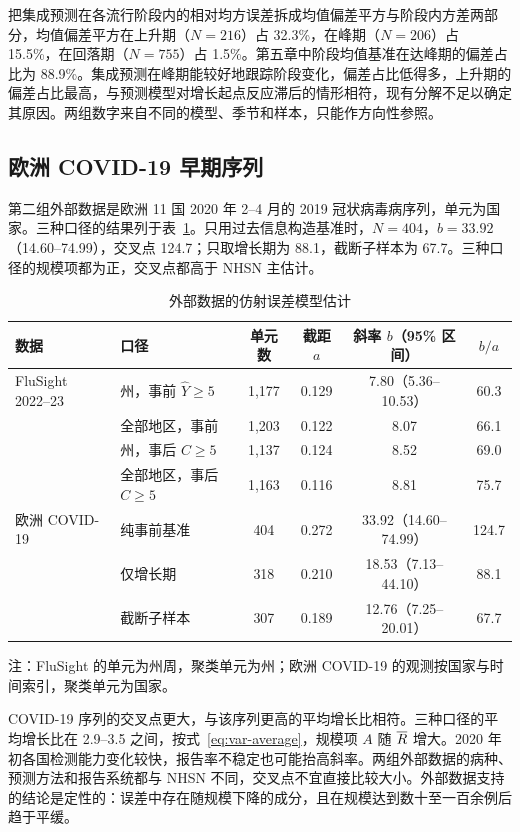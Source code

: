把集成预测在各流行阶段内的相对均方误差拆成均值偏差平方与阶段内方差两部分，均值偏差平方在上升期（$N=216$）占 32.3\%，在峰期（$N=206$）占 15.5\%，在回落期（$N=755$）占 1.5\%。第五章中阶段均值基准在达峰期的偏差占比为 88.9\%。集成预测在峰期能较好地跟踪阶段变化，偏差占比低得多，上升期的偏差占比最高，与预测模型对增长起点反应滞后的情形相符，现有分解不足以确定其原因。两组数字来自不同的模型、季节和样本，只能作方向性参照。

\subsection{欧洲 COVID-19 早期序列}

第二组外部数据是欧洲 11 国 2020 年 2--4 月的 2019 冠状病毒病序列\citep{flaxman2020estimating}，单元为国家。三种口径的结果列于表~\ref{tab:external}。只用过去信息构造基准时，$N=404$，$b=33.92$（14.60--74.99），交叉点 124.7；只取增长期为 88.1，截断子样本为 67.7。三种口径的规模项都为正，交叉点都高于 NHSN 主估计。

\begin{table}[!tbp]
  \centering
  \caption{外部数据的仿射误差模型估计}
  \label{tab:external}
  \small
  \begin{tabular}{@{}llcccc@{}}
    \toprule
    数据 & 口径 & 单元数 & 截距 $a$ & 斜率 $b$（95\% 区间） & $b/a$ \\
    \midrule
    FluSight 2022--23 & 州，事前 $\widehat Y\geq5$ & 1,177 & 0.129 & 7.80（5.36--10.53） & 60.3 \\
     & 全部地区，事前 & 1,203 & 0.122 & 8.07 & 66.1 \\
     & 州，事后 $C\geq5$ & 1,137 & 0.124 & 8.52 & 69.0 \\
     & 全部地区，事后 $C\geq5$ & 1,163 & 0.116 & 8.81 & 75.7 \\
    \midrule
    欧洲 COVID-19 & 纯事前基准 & 404 & 0.272 & 33.92（14.60--74.99） & 124.7 \\
     & 仅增长期 & 318 & 0.210 & 18.53（7.13--44.10） & 88.1 \\
     & 截断子样本 & 307 & 0.189 & 12.76（7.25--20.01） & 67.7 \\
    \bottomrule
  \end{tabular}

  \vspace{4pt}
  {\small 注：FluSight 的单元为州周，聚类单元为州；欧洲 COVID-19 的观测按国家与时间索引，聚类单元为国家。}
\end{table}

COVID-19 序列的交叉点更大，与该序列更高的平均增长比相符。三种口径的平均增长比在 2.9--3.5 之间，按式~\eqref{eq:var-average}，规模项 $A$ 随 $\overline{R}$ 增大。2020 年初各国检测能力变化较快，报告率不稳定也可能抬高斜率。两组外部数据的病种、预测方法和报告系统都与 NHSN 不同，交叉点不宜直接比较大小。外部数据支持的结论是定性的：误差中存在随规模下降的成分，且在规模达到数十至一百余例后趋于平缓。


